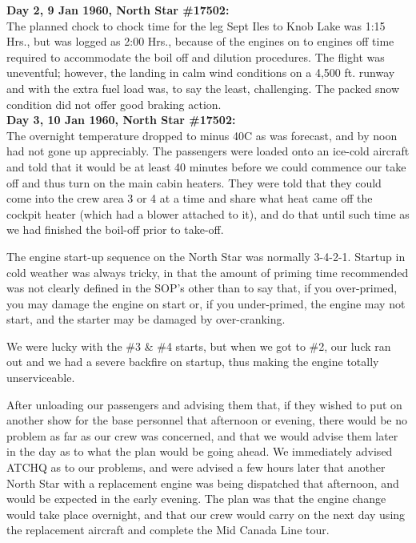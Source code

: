 \noindent\textbf{Day 2, 9 Jan 1960, North Star \#17502:}\\

The planned chock to chock time for the leg Sept Iles to Knob Lake was
1:15 Hrs., but was logged as 2:00 Hrs., because of the engines on to
engines off time required to accommodate the boil off and dilution
procedures. The flight was uneventful; however, the landing in calm
wind conditions on a 4,500 ft. runway and with the extra fuel load was,
to say the least, challenging. The packed snow condition did not offer
good braking action.\\

\noindent\textbf{Day 3, 10 Jan 1960, North Star \#17502:}\\

The overnight temperature dropped to minus 40C as was forecast, and by
noon had not gone up appreciably. The passengers were loaded onto an
ice-cold aircraft and told that it would be at least 40 minutes before
we could commence our take off and thus turn on the main cabin heaters.
They were told that they could come into the crew area 3 or 4 at a time
and share what heat came off the cockpit heater (which had a blower
attached to it), and do that until such time as we had finished the
boil-off prior to take-off.

The engine start-up sequence on the North Star was normally 3-4-2-1.
Startup in cold weather was always tricky, in that the amount of
priming time recommended was not clearly defined in the SOP's other
than to say that, if you over-primed, you may damage the engine on
start or, if you under-primed, the engine may not start, and the
starter may be damaged by over-cranking.

We were lucky with the \#3 \& \#4 starts, but when we got to \#2, our luck
ran out and we had a severe backfire on startup, thus making the engine
totally unserviceable.

After unloading our passengers and advising them that, if they wished
to put on another show for the base personnel that afternoon or
evening, there would be no problem as far as our crew was concerned,
and that we would advise them later in the day as to what the plan
would be going ahead. We immediately advised ATCHQ as to our problems,
and were advised a few hours later that another North Star with a
replacement engine was being dispatched that afternoon, and would be
expected in the early evening. The plan was that the engine change
would take place overnight, and that our crew would carry on the next
day using the replacement aircraft and complete the Mid Canada Line
tour.

